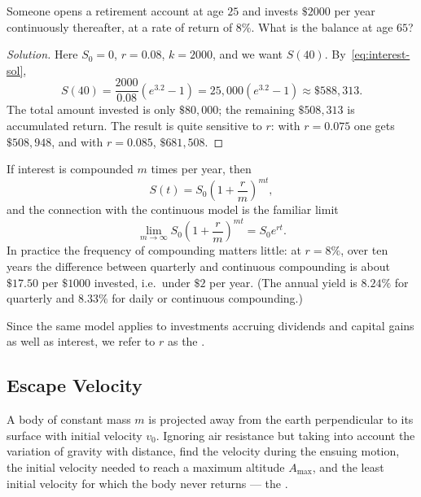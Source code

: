 \begin{eg}
	Someone opens a retirement account at age \(25\) and invests \(\$2000\) per year
	continuously thereafter, at a rate of return of \(8\%\). What is the balance at age
	\(65\)?
\end{eg}

\begin{proof}[Solution]
	Here \(S_0 = 0\), \(r = 0.08\), \(k = 2000\), and we want \(S(40)\).
	By~\eqref{eq:interest-sol},
	\[
		S(40) = \frac{2000}{0.08}\left( e^{3.2} - 1 \right)
		= 25{,}000 \left( e^{3.2} - 1 \right) \approx \$588{,}313.
	\]
	The total amount invested is only \(\$80{,}000\); the remaining \(\$508{,}313\) is
	accumulated return. The result is quite sensitive to \(r\): with \(r = 0.075\) one
	gets \(\$508{,}948\), and with \(r = 0.085\), \(\$681{,}508\).
\end{proof}

\begin{remark}
	If interest is compounded \(m\) times per year, then
	\[
		S(t) = S_0 \left( 1 + \frac{r}{m} \right)^{mt},
	\]
	and the connection with the continuous model is the familiar limit
	\[
		\lim_{m \to \infty} S_0 \left( 1 + \frac{r}{m} \right)^{mt} = S_0 e^{rt}.
	\]
	In practice the frequency of compounding matters little: at \(r = 8\%\), over ten
	years the difference between quarterly and continuous compounding is about
	\(\$17.50\) per \(\$1000\) invested, i.e.\ under \(\$2\) per year. (The annual yield
	is \(8.24\%\) for quarterly and \(8.33\%\) for daily or continuous compounding.)
\end{remark}

\begin{notation}
	Since the same model applies to investments accruing dividends and capital gains as
	well as interest, we refer to \(r\) as the .
\end{notation}

\subsection{Escape Velocity}

\begin{eg}
	A body of constant mass \(m\) is projected away from the earth perpendicular to its
	surface with initial velocity \(v_0\). Ignoring air resistance but taking into account
	the variation of gravity with distance, find the velocity during the ensuing motion,
	the initial velocity needed to reach a maximum altitude \(A_{\max}\), and the least
	initial velocity for which the body never returns --- the .
\end{eg}

